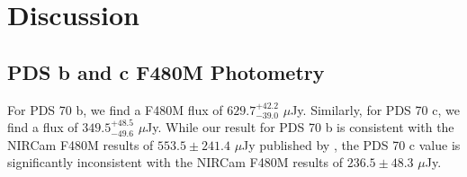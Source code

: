 \documentclass[11pt,twocolumn,twocolappendix]{aastex631}
\begin{document}
    
     


















\section{Discussion} 
\label{sec:disc}



\subsection{PDS b and c F480M Photometry}

{For PDS 70 b, we find a F480M flux of $629.7^{+42.2}_{-39.0}$ $\mu$Jy. Similarly, for PDS 70 c, we find a flux of $349.5^{+48.5}_{-49.6}$ $\mu$Jy. While our result for PDS 70 b is consistent with the NIRCam F480M results of $553.5 \pm 241.4$ $\mu$Jy published by \cite{2024arXiv240304855C}, %
the PDS 70 c value is significantly inconsistent with the NIRCam F480M results of $236.5 \pm 48.3$ $\mu$Jy.}%
\end{document}

